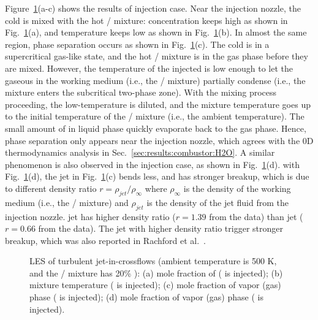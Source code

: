 Figure~\ref{JICFr}(a-c) shows the results of  injection case. Near the injection nozzle, the cold  is mixed with the hot / mixture:  concentration keeps high as shown in Fig.~\ref{JICFr}(a), and temperature keeps low as shown in Fig.~\ref{JICFr}(b). In almost the same region, phase separation occurs as shown in Fig.~\ref{JICFr}(c). The cold  is in a supercritical gas-like state, and the hot / mixture is in the gas phase before they are mixed. However, the temperature of the injected  is low enough to let the gaseous  in the working medium (i.e., the / mixture) partially condense (i.e., the mixture enters the subcritical two-phase zone). %
With the mixing process proceeding, the low-temperature  is diluted, and the mixture temperature goes up to the initial temperature of the / mixture (i.e., the ambient temperature). The small amount of  in liquid phase quickly evaporate back to the gas phase. Hence, phase separation only appears near the injection nozzle, which agrees with the 0D thermodynamics analysis in Sec.~\ref{sec:results:combustor:H2O}. A similar phenomenon is also observed in the  injection case, as shown in Fig.~\ref{JICFr}(d).  with Fig.~\ref{JICFr}(d), the jet in Fig.~\ref{JICFr}(c) bends less, and has stronger breakup, which is due to different density ratio $r=\rho_{jet}/\rho_{\infty}$ where $\rho_{\infty}$ is the density of the working medium (i.e., the / mixture) and $\rho_{jet}$ is the density of the jet fluid from the injection nozzle.  jet has higher density ratio ($r=1.39$ from the data) than  jet ($r=0.66$ from the data). The jet with higher density ratio trigger stronger breakup, which was also reported in Rachford et al.~\cite{tretola2021effect}.

\begin{figure}[htb]
    \centering

    \caption{LES of turbulent jet-in-crossflows (ambient temperature is 500 K, and the / mixture has 20\% ): (a) mole fraction of  ( is injected); (b) mixture temperature ( is injected); (c) mole fraction of vapor (gas) phase ( is injected); (d) mole fraction of vapor (gas) phase ( is injected).}
    \label{JICFr}
\end{figure}


